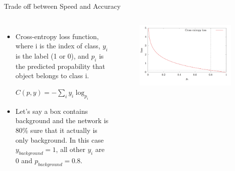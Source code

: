 \documentclass[aspectratio=169]{beamer}
\begin{document}
\begin{frame}{Trade off between Speed and Accuracy}
\begin{columns}[T, c, textwidth]
\begin{itemize}
    \item Cross-entropy loss function, where i is the index of class, $y_{i}$ is the label (1 or 0), and $p_{i}$ is the predicted propability that object belongs to class i.
    \begin{center}
    $C(p, y) = -\sum_{i}y_{i}\log_{p_{i}}$
    \end{center}    
    \item Let’s say a box contains background and the network is 80\% sure that it actually is only background. In this case $y_{background}=1$, all other $y_{i}$ are 0 and $p_{background}=0.8$.
\end{itemize}
\begin{figure}
    \centering
    \includegraphics[scale=.2]{demo/figs/fcl2.png}
\end{figure}
\end{columns}
\end{frame}
\end{document}
